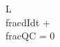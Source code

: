 \documentclass[preview]{standalone}
\begin{document}
\begin{center}
L\\frac{dI}{dt} + \\frac{Q}{C} = 0
\end{center}
\end{document}
